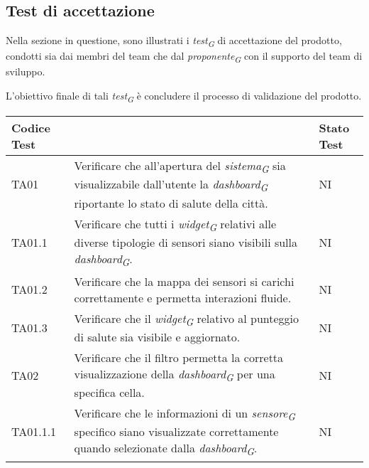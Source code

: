 \subsection{Test di accettazione}
Nella sezione in questione, sono illustrati i \textit{test}\textsubscript{\textit{G}} di accettazione del prodotto, condotti sia dai membri del team che dal \textit{proponente}\textsubscript{\textit{G}} con il supporto del team di sviluppo.

L'obiettivo finale di tali \textit{test}\textsubscript{\textit{G}} è concludere il processo di validazione del prodotto.

\vspace{0.4cm}

\begin{longtable}{|C{1.9cm}|L{5cm}|C{2cm}|}
    \hline
    \textbf{Codice Test} &  & \textbf{Stato Test} \\
    \hline \hline
    
    TA01 & Verificare che all'apertura del \textit{sistema}\textsubscript{\textit{G}} sia visualizzabile dall'utente la \textit{dashboard}\textsubscript{\textit{G}} riportante lo stato di salute della città. & NI \\
    \hline
    
    TA01.1 & Verificare che tutti i \textit{widget}\textsubscript{\textit{G}} relativi alle diverse tipologie di sensori siano visibili sulla \textit{dashboard}\textsubscript{\textit{G}}. & NI \\
    \hline
    
    TA01.2 & Verificare che la mappa dei sensori si carichi correttamente e permetta interazioni fluide. & NI \\
    \hline
    
    TA01.3 & Verificare che il \textit{widget}\textsubscript{\textit{G}} relativo al punteggio di salute sia visibile e aggiornato. & NI \\
    \hline
    
    TA02 & Verificare che il filtro permetta la corretta visualizzazione della \textit{dashboard}\textsubscript{\textit{G}} per una specifica cella. & NI \\
    \hline
    
    TA01.1.1 & Verificare che le informazioni di un \textit{sensore}\textsubscript{\textit{G}} specifico siano visualizzate correttamente quando selezionate dalla \textit{dashboard}\textsubscript{\textit{G}}. & NI \\
    \hline
    

\end{longtable}
